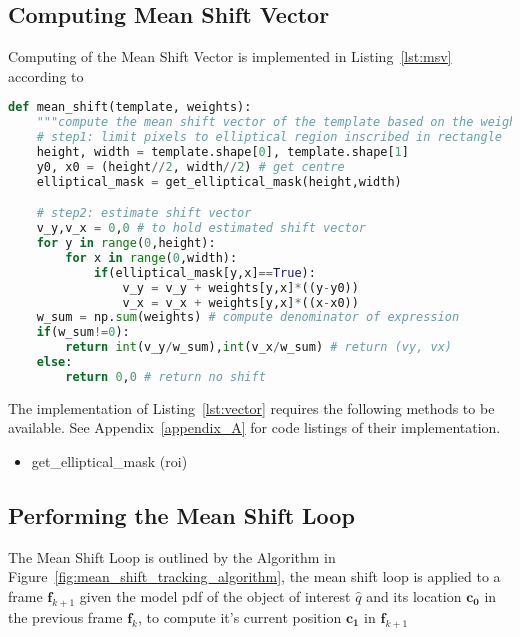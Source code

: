 \subsection{Computing Mean Shift Vector}
Computing of the Mean Shift Vector is implemented in Listing~\ref{lst:msv}
according to %

\begin{lstlisting}[language=Python, caption={Computing Mean Shift Vector}, captionpos=b, label={lst:msv}]
def mean_shift(template, weights):
    """compute the mean shift vector of the template based on the weights"""
    # step1: limit pixels to elliptical region inscribed in rectangle
    height, width = template.shape[0], template.shape[1]
    y0, x0 = (height//2, width//2) # get centre 
    elliptical_mask = get_elliptical_mask(height,width)

    # step2: estimate shift vector
    v_y,v_x = 0,0 # to hold estimated shift vector
    for y in range(0,height):
        for x in range(0,width): 
            if(elliptical_mask[y,x]==True):
                v_y = v_y + weights[y,x]*((y-y0)) 
                v_x = v_x + weights[y,x]*((x-x0))
    w_sum = np.sum(weights) # compute denominator of expression
    if(w_sum!=0):
        return int(v_y/w_sum),int(v_x/w_sum) # return (vy, vx)
    else:
        return 0,0 # return no shift
\end{lstlisting}

The implementation of Listing~\ref{lst:vector} requires the following methods to
be available. See Appendix~\ref{appendix_A} for code listings of their implementation. 
\begin{itemize}
    \item get\_elliptical\_mask (roi)
\end{itemize}

\subsection{Performing the Mean Shift Loop}
The Mean Shift Loop is outlined by the Algorithm in
Figure~\ref{fig:mean_shift_tracking_algorithm}, the mean shift loop is
applied to a frame $\mathbf{f}_{k+1}$ given the model pdf of the object of
interest $\hat{q}$ and its location $\mathbf{c_0}$ in the previous frame
$\mathbf{f}_{k}$, to compute it's current position $\mathbf{c_1}$ in
$\mathbf{f}_{k+1}$

